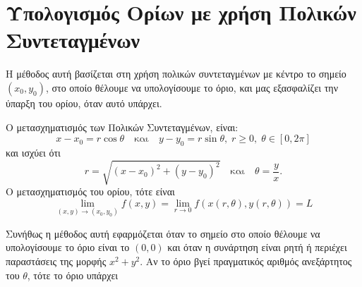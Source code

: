 \section{Υπολογισμός Ορίων με χρήση Πολικών Συντεταγμένων}

Η μέθοδος αυτή βασίζεται στη χρήση πολικών συντεταγμένων με κέντρο το σημείο 
$ (x_{0}, y_{0}) $, στο οποίο θέλουμε να υπολογίσουμε το όριο, και μας εξασφαλίζει 
την ύπαρξη του ορίου, όταν αυτό υπάρχει.

\begin{rem}
\item {}
    \begin{myitemize}
    \item Ο μετασχηματισμός των Πολικών Συντεταγμένων, είναι:
        \[
            x - x_{0} = r \cos{\theta} \quad \text{και} \quad y - y_{0} = 
            r \sin{\theta}, \; r \geq 0, \; \theta \in [0, 2 \pi]
        \] 
        και ισχύει ότι 
        \[
            r = \sqrt{(x- x_{0})^{2}+(y- y_{0})^{2}} \quad \text{και} \quad \theta = 
            \frac{y}{x}.
        \] 
        Ο μετασχηματισμός του ορίου, τότε είναι 
        \[
            \lim\limits_{(x,y)\to (x_{0}, y_{0})} f(x,y) = 
            \lim_{r \to 0} f(x(r, \theta ), y(r, \theta)) = L
        \] 


    \item Συνήθως η μέθοδος αυτή εφαρμόζεται όταν το σημείο στο οποίο θέλουμε να 
        υπολογίσουμε το όριο είναι το $ (0,0) $ και όταν η συνάρτηση είναι ρητή ή 
        περιέχει παραστάσεις της μορφής $ x^{2}+y^{2} $. Αν το όριο βγεί 
        πραγματικός αριθμός ανεξάρτητος του $\theta$, τότε το όριο υπάρχει 
    \end{myitemize}
\end{rem}

